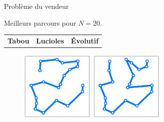 \documentclass{beamer}
\begin{document}
\begin{frame}{Problème du vendeur}
\begin{center}
  Meilleurs parcours pour $N=20$.
\end{center}
\vspace{-0.5cm}
\begin{table}
  \centering
  \begin{tabular}{C{3cm}C{3cm}C{3cm}}
  \textbf{Tabou} & \textbf{Lucioles} & \textbf{Évolutif}
  \end{tabular}
\end{table}
\vspace{-1cm}
\begin{figure}[h!]
  \centering
  \includegraphics[width=0.32\textwidth]{figures/salesman_tabu_n20.pdf}
    \includegraphics[width=0.32\textwidth]{figures/salesman_firefly_n20.pdf}
\end{figure}




\end{frame}
\end{document}

